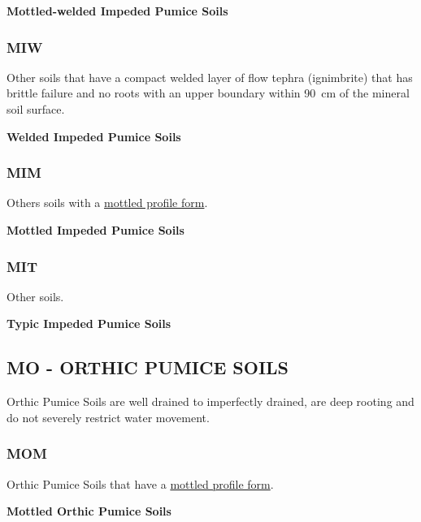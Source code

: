 \documentclass[
  letterpaper,
  DIV=11,
  numbers=noendperiod]{scrreprt}
\begin{document}
\textbf{Mottled-welded Impeded Pumice Soils}

\hypertarget{sec-key-MIW}{%
\subsubsection{\texorpdfstring{\textbf{MIW}}{MIW}}\label{sec-key-MIW}}

Other soils that have a compact welded layer of flow tephra (ignimbrite)
that has brittle failure and no roots with an upper boundary within
90~cm of the mineral soil surface.

\textbf{Welded Impeded Pumice Soils}

\hypertarget{sec-key-MIM}{%
\subsubsection{\texorpdfstring{\textbf{MIM}}{MIM}}\label{sec-key-MIM}}

Others soils with a \protect\hyperlink{sec-diag-mottpf}{mottled profile
form}.

\textbf{Mottled Impeded Pumice Soils}

\hypertarget{sec-key-MIT}{%
\subsubsection{\texorpdfstring{\textbf{MIT}}{MIT}}\label{sec-key-MIT}}

Other soils.

\textbf{Typic Impeded Pumice Soils}

\hypertarget{sec-MO}{%
\subsection{\texorpdfstring{\textbf{MO} - ORTHIC PUMICE
SOILS}{MO - ORTHIC PUMICE SOILS}}\label{sec-MO}}

Orthic Pumice Soils are well drained to imperfectly drained, are deep
rooting and do not severely restrict water movement.

\hypertarget{sec-key-MOM}{%
\subsubsection{\texorpdfstring{\textbf{MOM}}{MOM}}\label{sec-key-MOM}}

Orthic Pumice Soils that have a
\protect\hyperlink{sec-diag-mottpf}{mottled profile form}.

\textbf{Mottled Orthic Pumice Soils}
\end{document}
